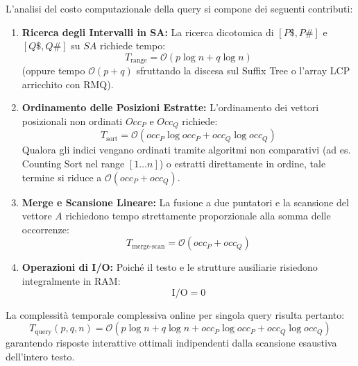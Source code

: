 L'analisi del costo computazionale della query si compone dei seguenti contributi:
\begin{enumerate}
  \item \textbf{Ricerca degli Intervalli in SA:} La ricerca dicotomica di $[P\$, P\#]$ e $[Q\$, Q\#]$ su $SA$ richiede tempo:
  \begin{equation}
    T_{\text{range}} = \mathcal{O}(p \log n + q \log n)
  \end{equation}
  (oppure tempo $\mathcal{O}(p + q)$ sfruttando la discesa sul Suffix Tree o l'array LCP arricchito con RMQ).
  \item \textbf{Ordinamento delle Posizioni Estratte:} L'ordinamento dei vettori posizionali non ordinati $Occ_P$ e $Occ_Q$ richiede:
  \begin{equation}
    T_{\text{sort}} = \mathcal{O}(occ_P \log occ_P + occ_Q \log occ_Q)
  \end{equation}
  Qualora gli indici vengano ordinati tramite algoritmi non comparativi (ad es. Counting Sort nel range $[1 \dots n]$) o estratti direttamente in ordine, tale termine si riduce a $\mathcal{O}(occ_P + occ_Q)$.
  \item \textbf{Merge e Scansione Lineare:} La fusione a due puntatori e la scansione del vettore $A$ richiedono tempo strettamente proporzionale alla somma delle occorrenze:
  \begin{equation}
    T_{\text{merge-scan}} = \mathcal{O}(occ_P + occ_Q)
  \end{equation}
  \item \textbf{Operazioni di I/O:} Poich\'e il testo e le strutture ausiliarie risiedono integralmente in RAM:
  \begin{equation}
    \text{I/O} = 0
  \end{equation}
\end{enumerate}

La complessit\`a temporale complessiva online per singola query risulta pertanto:
\begin{equation}
  T_{\text{query}}(p, q, n) = \mathcal{O}(p \log n + q \log n + occ_P \log occ_P + occ_Q \log occ_Q)
\end{equation}
garantendo risposte interattive ottimali indipendenti dalla scansione esaustiva dell'intero testo.
